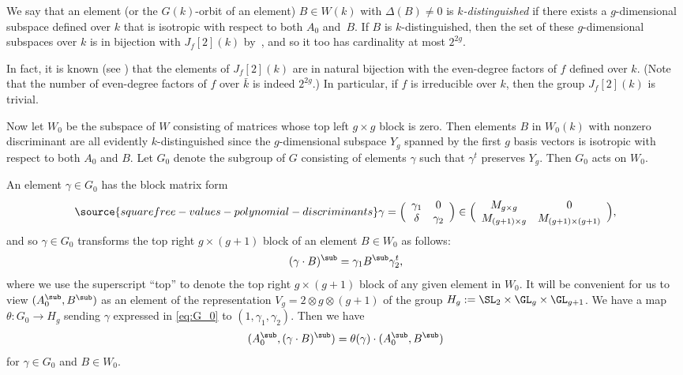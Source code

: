 We say that an element (or the $G(k)$-orbit of an element) $B\in W(k)$ with $\Delta(B)\neq 0$
is {\it $k$-distinguished} if there exists a $g$-dimensional subspace
defined over $k$ that is isotropic with respect to both $A_0$ and~$B$. If $B$ is $k$-distinguished, then the set of these $g$-dimensional
subspaces over $k$ is in bijection with $J_f[2](k)$
by~\cite[Proposition~4.1]{BG2}, and so it too has cardinality at most
$2^{2g}$.

In fact, it is known (see \cite[Proposition~5.1]{BG2}) that the
elements of $J_f[2](k)$ are in natural bijection with the even-degree
factors of $f$ defined over $k$.  (Note that the number of even-degree
factors of $f$ over $\bar k$ is indeed $2^{2g}$.) In particular, if
$f$ is irreducible over $k$, then the group $J_f[2](k)$ is trivial.

Now let $W_0$ be the subspace of $W$ consisting of matrices whose top left
$g\times g$ block is zero. Then elements $B$ in $W_0(k)$ with nonzero
discriminant are all evidently $k$-distinguished since the $g$-dimensional subspace
$Y_g$ spanned by the first $g$ basis vectors is isotropic with respect
to both $A_0$ and $B$.
Let $G_0$ denote the subgroup of $G$
consisting of elements $\gamma$ such that $\gamma^t$ preserves
$Y_g$. Then $G_0$ acts on $W_0$.

An element $\gamma\in G_0$ has the block matrix form
\begin{equation}\label{eq:G_0}
\source{squarefree-values-polynomial-discriminants}
\gamma=\Bigl(\begin{array}{cc}\gamma_1 & 0\\ \delta & \gamma_2
\end{array}\Bigr)\in\Bigl(\begin{array}{cc}M_{g\times g} & 0\\ M_{(g+1)\times g} & M_{(g+1)\times (g+1)}
\end{array}\Bigr),
\end{equation}
and so $\gamma\in G_0$ transforms the top right $g\times (g+1)$ block
of an element $B\in W_0$ as follows:
$$(\gamma\cdot B)^\sub = \gamma_1B^\sub\gamma_2^t,$$ where we use the
superscript ``top'' to denote the top right $g\times (g+1)$ block of
any given element in $W_0$.  It will be convenient for us to view
$(A_0^\sub,B^\sub)$ as an element of the representation $V_g=2\otimes
g\otimes (g+1)$ of the group $H_g:=\SL_2\times\GL_g\times\GL_{g+1}$.
We have a map $\theta:G_0\to H_g$ sending $\gamma$ expressed in \eqref{eq:G_0} to
$(1,\gamma_1,\gamma_2)$. Then we have $$(A_0^\sub,(\gamma\cdot
B)^\sub)=\theta(\gamma)\cdot(A_0^\sub,B^\sub)$$ for $\gamma\in G_0$ and
$B\in W_0$.

